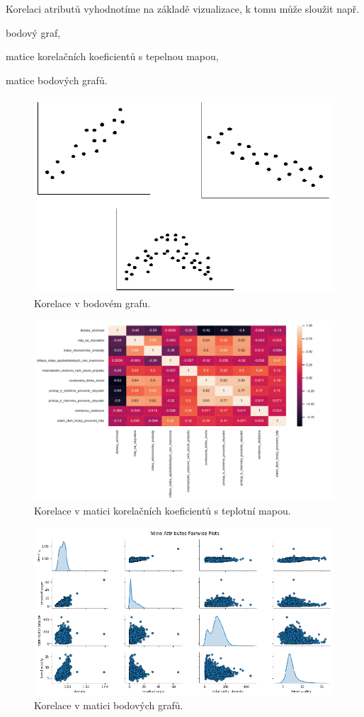 \begin{compactitem}
    \item Korelaci atributů vyhodnotíme na základě vizualizace, k tomu může sloužit např. \begin{compactitem}
        \item bodový graf,
        \item matice korelačních koeficientů s tepelnou mapou,
        \item matice bodových grafů.
    \end{compactitem}
\end{compactitem}

\begin{figure}[H]
    \centering
    \includegraphics[width=0.5\linewidth]{korelace_bodovy_graf.png}
    \caption{Korelace v bodovém grafu.}
\end{figure}

\begin{figure}[H]
    \centering
    \includegraphics[width=1\linewidth]{korelace_teplotni_mapa.pdf}
    \caption{Korelace v matici korelačních koeficientů s teplotní mapou.}
\end{figure}

\begin{figure}[H]
    \centering
    \includegraphics[width=1\linewidth]{korelace_matice.png}
    \caption{Korelace v matici bodových grafů.}
\end{figure}

